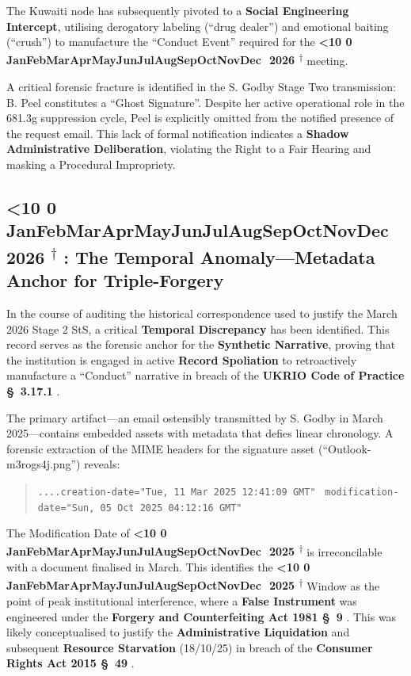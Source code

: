 \documentclass{EMBASSY}
\DeclareRobustCommand{\gmt}[3]{%
    \texorpdfstring{%
        {\color{DateGold}\textbf{%
            \ifnum#1<10 0\fi#1\,\textperiodcentered\,%
            \ifcase#2\or Jan\or Feb\or Mar\or Apr\or May\or Jun\or Jul\or Aug\or Sep\or Oct\or Nov\or Dec\fi
            \,\textperiodcentered\,20#3%
            \textsuperscript{$\dagger$}%
        }}%
    }{%
        (#1/#2/#3)%
    }%
}
\begin{document}
The Kuwaiti node has subsequently pivoted to a \textbf{Social Engineering Intercept}, utilising derogatory labeling (``drug dealer'') and emotional baiting (``crush'') to manufacture the ``Conduct Event'' required for the \gmt{3}{3}{26} meeting.

A critical forensic fracture is identified in the S. Godby Stage Two transmission: B. Peel constitutes a ``Ghost Signature''. Despite her active operational role in the 681.3g suppression cycle, Peel is explicitly omitted from the notified presence of the request email. This lack of formal notification indicates a \textbf{Shadow Administrative Deliberation}, violating the Right to a Fair Hearing and masking a Procedural Impropriety.

\subsection{\gmt{5}{3}{26}: The Temporal Anomaly---Metadata Anchor for Triple-Forgery}
In the course of auditing the historical correspondence used to justify the March 2026 Stage 2 StS, a critical \textbf{Temporal Discrepancy} has been identified. This record serves as the forensic anchor for the \textbf{Synthetic Narrative}, proving that the institution is engaged in active \textbf{Record Spoliation} to retroactively manufacture a ``Conduct'' narrative in breach of the \textbf{UKRIO Code of Practice \S~3.17.1} \cite{UKRIO}.

The primary artifact---an email ostensibly transmitted by S. Godby in March 2025---contains embedded assets with metadata that defies linear chronology. A forensic extraction of the MIME headers for the signature asset (``Outlook-m3rogs4j.png'') reveals:

\begin{quote}
	\texttt{....creation-date="Tue, 11 Mar 2025 12:41:09 GMT"} \
	\texttt{modification-date="Sun, 05 Oct 2025 04:12:16 GMT"}
\end{quote}

\noindent The Modification Date of \gmt{5}{10}{25} is irreconcilable with a document finalised in March. This identifies the \gmt{5}{10}{25} Window as the point of peak institutional interference, where a \textbf{False Instrument} was engineered under the \textbf{Forgery and Counterfeiting Act 1981 \S~9} \cite{FCA81}. This was likely conceptualised to justify the \textbf{Administrative Liquidation} and subsequent \textbf{Resource Starvation} (18/10/25) in breach of the \textbf{Consumer Rights Act 2015 \S~49} \cite{CRA15}.
\end{document}
